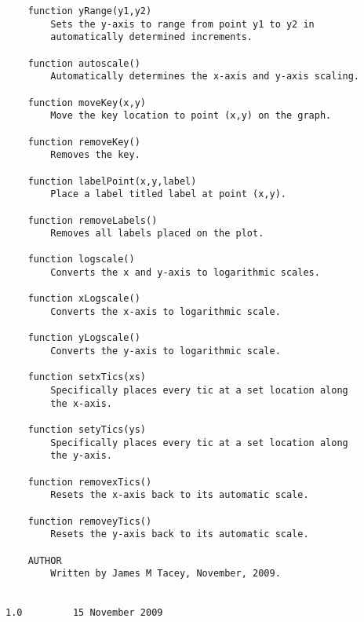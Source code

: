 \begin{codesize}
\begin{verbatim}
	function yRange(y1,y2)
		Sets the y-axis to range from point y1 to y2 in 
		automatically determined increments.

	function autoscale()
		Automatically determines the x-axis and y-axis scaling.

	function moveKey(x,y)
		Move the key location to point (x,y) on the graph.

	function removeKey()
		Removes the key.
	
	function labelPoint(x,y,label)
		Place a label titled label at point (x,y).

	function removeLabels()
		Removes all labels placed on the plot.

	function logscale()
		Converts the x and y-axis to logarithmic scales.

	function xLogscale()
		Converts the x-axis to logarithmic scale.
		
	function yLogscale()
		Converts the y-axis to logarithmic scale.

	function setxTics(xs)
		Specifically places every tic at a set location along 
		the x-axis.
	
	function setyTics(ys)
		Specifically places every tic at a set location along 
		the y-axis.

	function removexTics()
		Resets the x-axis back to its automatic scale.

	function removeyTics()
		Resets the y-axis back to its automatic scale.

    AUTHOR
		Written by James M Tacey, November, 2009.


1.0			15 November 2009
\end{verbatim}
\end{codesize}
\color{black}

